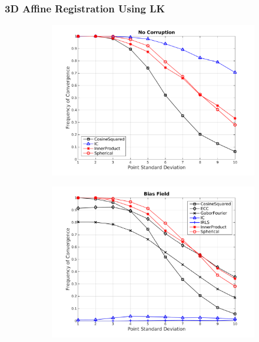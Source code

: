 \subsubsection{3D Affine Registration Using LK}\label{subsubsec:lk_results}
\begin{figure}
    \centering
    \begin{subfigure}{0.52\textwidth}
        \includegraphics[width=\textwidth]{statistical_normals/lk/3d/images/NoCorruption_Smoothing_2-crop}
        \caption{}\label{fig:lk_results_nocorruption}
    \end{subfigure} \hspace*{-1cm}
    \begin{subfigure}{0.52\textwidth}
        \includegraphics[width=\textwidth]{statistical_normals/lk/3d/images/BiasField_Smoothing_2-crop}

\end{subfigure}
\end{figure}
